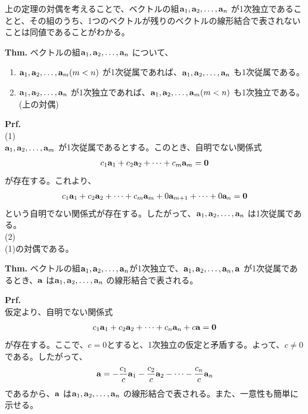 \documentclass[a4paper,11pt]{jsarticle}
\numberwithin{equation}{section}
\begin{document}
上の定理の対偶を考えることで、ベクトルの組$\vb{a}_1, \vb{a}_2, \dots, \vb{a}_n$ が1次独立であることと、その組のうち、1つのベクトルが残りのベクトルの線形結合で表されないことは同値であることがわかる。\\

\begin{itembox}[l]{\textbf{Thm.}}
  ベクトルの組$\vb{a}_1, \vb{a}_2, \dots, \vb{a}_n$ について、
  \begin{enumerate}
    \item $\vb{a}_1, \vb{a}_2, \dots, \vb{a}_m (m < n)$ が1次従属であれば、$\vb{a}_1, \vb{a}_2, \dots, \vb{a}_n$ も1次従属である。
    \item $\vb{a}_1, \vb{a}_2, \dots, \vb{a}_n$ が1次独立であれば、$\vb{a}_1, \vb{a}_2, \dots, \vb{a}_m (m < n)$ も1次独立である。(上の対偶)
  \end{enumerate}
\end{itembox}
\textbf{Prf.}\\
(1)\\
$\vb{a}_1, \vb{a}_2, \dots, \vb{a}_m$ が1次従属であるとする。このとき、自明でない関係式
\begin{align}
  c_1\vb{a}_1 + c_2\vb{a}_2 + \dots + c_m\vb{a}_m = \vb{0}
\end{align}
が存在する。これより、
\begin{align}
  c_1\vb{a}_1 + c_2\vb{a}_2 + \dots + c_m\vb{a}_m + 0\vb{a}_{m+1} + \dots + 0\vb{a}_n = \vb{0}
\end{align}
という自明でない関係式が存在する。したがって、$\vb{a}_1, \vb{a}_2, \dots, \vb{a}_n$ は1次従属である。\\
(2)\\
(1)の対偶である。\hfill\qedsymbol\\

\begin{itembox}[l]{\textbf{Thm.}}
  ベクトルの組$\vb{a}_1, \vb{a}_2, \dots, \vb{a}_n$が1次独立で、$\vb{a}_1, \vb{a}_2, \dots, \vb{a}_n, \vb{a}$ が1次従属であるとき、$\vb{a}$ は$\vb{a}_1, \vb{a}_2, \dots, \vb{a}_n$ の線形結合で表される。
\end{itembox}
\textbf{Prf.}\\
仮定より、自明でない関係式
\begin{align}
  c_1\vb{a}_1 + c_2\vb{a}_2 + \dots + c_n\vb{a}_n + c\vb{a} = \vb{0}
\end{align}
が存在する。ここで、$c =0$とすると、1次独立の仮定と矛盾する。よって、$c \neq 0$である。したがって、
\begin{align}
  \vb{a} = -\frac{c_1}{c}\vb{a}_1 - \frac{c_2}{c}\vb{a}_2 - \dots - \frac{c_n}{c}\vb{a}_n
\end{align}
であるから、$\vb{a}$ は$\vb{a}_1, \vb{a}_2, \dots, \vb{a}_n$ の線形結合で表される。また、一意性も簡単に示せる。\hfill\qedsymbol\\
\end{document}
